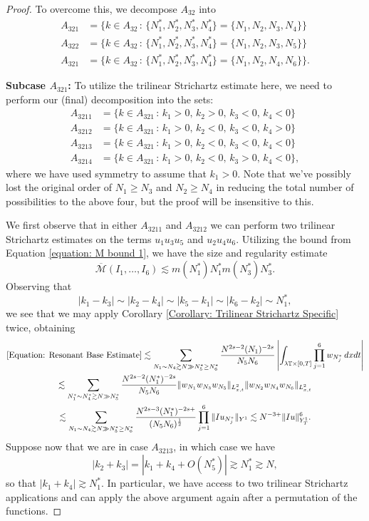 \documentclass[12pt, letterpaper]{amsart}
\begin{document}
\begin{proof}
    To overcome this, we decompose $A_{32}$ into
    \begin{align*}
        A_{321} &= \{k\in A_{32}\,:\,\{N_1^*,N_2^*,N_3^*,N_4^*\} = \{N_1,N_2,N_3,N_4\}\}\\
        A_{322} &= \{k\in A_{32}\,:\,\{N_1^*,N_2^*,N_3^*,N_4^*\} = \{N_1,N_2,N_3,N_5\}\}\\
        A_{321} &= \{k\in A_{32}\,:\,\{N_1^*,N_2^*,N_3^*,N_4^*\} = \{N_1,N_2,N_4,N_6\}\}.
    \end{align*}

    \textbf{Subcase $A_{321}$: } To utilize the trilinear Strichartz estimate here, we need to perform our (final) decomposition into the sets:
    \begin{align*}
        A_{3211} &= \{k\in A_{321}\,:\,k_1 >0,\, k_2 > 0,\, k_3 < 0,\, k_4 < 0\}\\
        A_{3212} &= \{k\in A_{321}\,:\,k_1 >0,\, k_2 < 0,\, k_3 < 0,\, k_4 > 0\}\\
        A_{3213} &= \{k\in A_{321}\,:\,k_1 >0,\, k_2 < 0,\, k_3 < 0,\, k_4 < 0\}\\
        A_{3214} &= \{k\in A_{321}\,:\,k_1 >0,\, k_2 < 0,\, k_3 > 0,\, k_4 < 0\},
    \end{align*}
    where we have used symmetry to assume that $k_1 > 0$. Note that we've possibly lost the original order of $N_1\geq N_3$ and $N_2\geq N_4$ in reducing the total number of possibilities to the above four, but the proof will be insensitive to this.

    We first observe that in either $A_{3211}$ and $A_{3212}$ we can perform two trilinear Strichartz estimates on the terms $u_1u_3u_5$ and $u_2u_4u_6$. Utilizing the bound from Equation \eqref{equation: M bound 1}, we have the size and regularity estimate
    \[
    \overline{\mathcal{M}}(I_1,\dots, I_6)\lesssim m(N_1^*)N_1^*m(N_3^*)N_3^*.
    \]
    Observing that
    \[
    |k_1-k_3|\sim |k_2-k_4|\sim |k_5-k_1|\sim |k_6-k_2|\sim N_1^*,
    \]
    we see that we may apply Corollary \ref{Corollary: Trilinear Strichartz Specific} twice, obtaining
    \begin{multline*}
        \eqref{Equation: Resonant Base Estimate}\lesssim \sum_{N_1\sim N_4\gtrsim N\gg N_5^*\geq N_6^*}\frac{N^{2s-2}(N_1)^{-2s}}{N_5N_6}\left|\int_{\lambda\mathbb{T}\times [0,T]}\prod_{j=1}^6w_{N_j^*}\,dxdt\right|\\
        \lesssim \sum_{N_1^*\sim N_4^*\gtrsim N\gg N_5^*}\frac{N^{2s-2}(N_1^*)^{-2s}}{N_5N_6}\|w_{N_1}w_{N_3}w_{N_5}\|_{L^2_{x,t}}\|w_{N_2}w_{N_4}w_{N_6}\|_{L^2_{x,t}}\\
        \lesssim \sum_{N_1\sim N_4\gtrsim N\gg N_5^*\geq N_6^*}\frac{N^{2s-3}(N_1^*)^{-2s+}}{(N_5N_6)^{\frac12}}\prod_{j=1}^6\|Iu_{N_j^*}\|_{Y^1}\lesssim N^{-3+}\|Iu\|_{Y^1_T}^6.
    \end{multline*}
    Suppose now that we are in case $A_{3213}$, in which case we have
    \[
    |k_2+k_3| = |k_1+k_4 + O(N_5^*)|\gtrsim N_1^*\gtrsim N,
    \]
    so that $|k_1+k_4|\gtrsim N_1^*$. In particular, we have access to two trilinear Strichartz applications and can apply the above argument again after a permutation of the functions.


\end{proof}
\end{document}
